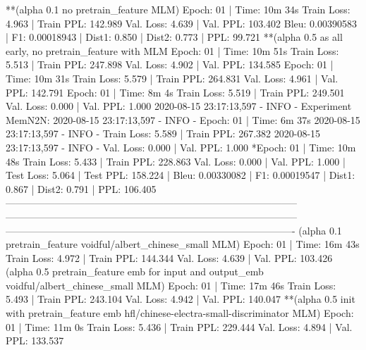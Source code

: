\documentclass[letterpaper]{article} %
\begin{document}
\begin{CJK*}{UTF8}{gbsn}
**(alpha 0.1 no pretrain_feature MLM)
Epoch: 01 | Time: 10m 34s
	Train Loss: 4.963 | Train PPL: 142.989
	 Val. Loss: 4.639 |  Val. PPL: 103.402
Bleu: 0.00390583 | F1: 0.00018943 | Dist1: 0.850 | Dist2: 0.773 | PPL:  99.721
**(alpha 0.5 as all early, no pretrain_feature with MLM %
Epoch: 01 | Time: 10m 51s
	Train Loss: 5.513 | Train PPL: 247.898
	 Val. Loss: 4.902 |  Val. PPL: 134.585
Epoch: 01 | Time: 10m 31s
	Train Loss: 5.579 | Train PPL: 264.831
	 Val. Loss: 4.961 |  Val. PPL: 142.791
Epoch: 01 | Time: 8m 4s
	Train Loss: 5.519 | Train PPL: 249.501
	 Val. Loss: 0.000 |  Val. PPL:   1.000
2020-08-15 23:17:13,597 - INFO - Experiment MemN2N: 
2020-08-15 23:17:13,597 - INFO - Epoch: 01 | Time: 6m 37s
2020-08-15 23:17:13,597 - INFO - 	Train Loss: 5.589 | Train PPL: 267.382
2020-08-15 23:17:13,597 - INFO - 	 Val. Loss: 0.000 |  Val. PPL:   1.000
*Epoch: 01 | Time: 10m 48s
	Train Loss: 5.433 | Train PPL: 228.863
	 Val. Loss: 0.000 |  Val. PPL:   1.000
| Test Loss: 5.064 | Test PPL: 158.224 |
Bleu: 0.00330082 | F1: 0.00019547 | Dist1: 0.867 | Dist2: 0.791 | PPL: 106.405
-----------------------------------------------------------------------------------------
-----------------------------------------------------------------------------------------
----------------------------------------------------------------------------------------
(alpha 0.1 pretrain_feature voidful/albert_chinese_small MLM)
Epoch: 01 | Time: 16m 43s
	Train Loss: 4.972 | Train PPL: 144.344
	 Val. Loss: 4.639 |  Val. PPL: 103.426
(alpha 0.5 pretrain_feature emb for input and output_emb voidful/albert_chinese_small MLM)
Epoch: 01 | Time: 17m 46s
	Train Loss: 5.493 | Train PPL: 243.104
	 Val. Loss: 4.942 |  Val. PPL: 140.047
**(alpha 0.5 init with pretrain_feature emb hfl/chinese-electra-small-discriminator MLM)
Epoch: 01 | Time: 11m 0s
	Train Loss: 5.436 | Train PPL: 229.444
	 Val. Loss: 4.894 |  Val. PPL: 133.537


\end{CJK*}
\end{document}
